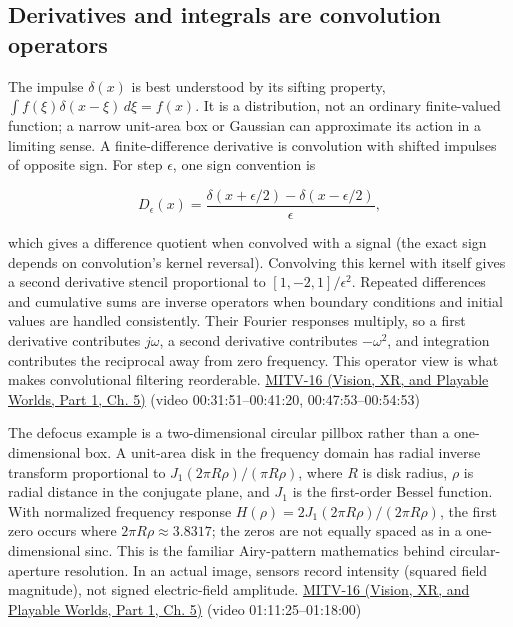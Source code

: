 \subsection{Derivatives and integrals are convolution operators}\label{03-visual-computing-i-ch004-derivatives-and-integrals-are-convolution-operators}

\hypertarget{03-visual-computing-i-ch004-derivatives-and-integrals-are-convolution-operators}{}

The impulse \(\delta(x)\) is best understood by its sifting property, \(\int f(\xi)\delta(x-\xi)\,d\xi=f(x)\). It is a distribution, not an ordinary finite-valued function; a narrow unit-area box or Gaussian can approximate its action in a limiting sense. A finite-difference derivative is convolution with shifted impulses of opposite sign. For step \(\epsilon\), one sign convention is

\[
D_\epsilon(x)=\frac{\delta(x+\epsilon/2)-\delta(x-\epsilon/2)}{\epsilon},
\]

which gives a difference quotient when convolved with a signal (the exact sign depends on convolution's kernel reversal). Convolving this kernel with itself gives a second derivative stencil proportional to \([1,-2,1]/\epsilon^2\). Repeated differences and cumulative sums are inverse operators when boundary conditions and initial values are handled consistently. Their Fourier responses multiply, so a first derivative contributes \(j\omega\), a second derivative contributes \(-\omega^2\), and integration contributes the reciprocal away from zero frequency. This operator view is what makes convolutional filtering reorderable. \href{../07-Vision-XR-and-Playable-Worlds-P01/main.pdf\#nameddest=04-visual-computing-ii-ch036-mitv-16---fast-convolution-low-pass-filter-approximations-integral-images-us-6457032}{MITV-16 (Vision, XR, and Playable Worlds, Part 1, Ch. 5)} (video 00:31:51--00:41:20, 00:47:53--00:54:53)

The defocus example is a two-dimensional circular pillbox rather than a one-dimensional box. A unit-area disk in the frequency domain has radial inverse transform proportional to \(J_1(2\pi R\rho)/(\pi R\rho)\), where \(R\) is disk radius, \(\rho\) is radial distance in the conjugate plane, and \(J_1\) is the first-order Bessel function. With normalized frequency response \(H(\rho)=2J_1(2\pi R\rho)/(2\pi R\rho)\), the first zero occurs where \(2\pi R\rho\approx3.8317\); the zeros are not equally spaced as in a one-dimensional sinc. This is the familiar Airy-pattern mathematics behind circular-aperture resolution. In an actual image, sensors record intensity (squared field magnitude), not signed electric-field amplitude. \href{../07-Vision-XR-and-Playable-Worlds-P01/main.pdf\#nameddest=04-visual-computing-ii-ch036-mitv-16---fast-convolution-low-pass-filter-approximations-integral-images-us-6457032}{MITV-16 (Vision, XR, and Playable Worlds, Part 1, Ch. 5)} (video 01:11:25--01:18:00)

